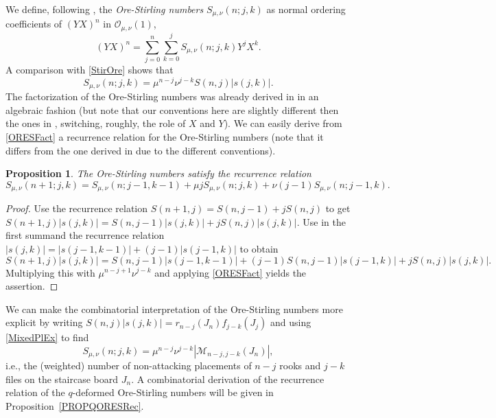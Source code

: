 \documentclass[10pt]{amsart}
\newtheorem{proposition}[theorem]{Proposition}%
\begin{document}
We define, following \cite{TMMS2023}, the {\em Ore-Stirling numbers} $S_{\mu,\nu}(n;j,k) $ as normal ordering coefficients of $(YX)^n$ in ${\mathcal O}_{\mu,\nu}(1)$,
\begin{equation}\label{OreStirlingDef}
(YX)^n = \sum_{j=0}^{n} \sum_{k=0}^{j} S_{\mu,\nu}(n;j,k) Y^{j}X^{k}.
\end{equation}
A comparison with \eqref{StirOre} shows that
\begin{equation}\label{ORESFact}
S_{\mu,\nu}(n;j,k) = \mu^{n-j} \nu^{j-k} S(n,j) |s(j,k)|.
\end{equation}
The factorization of the Ore-Stirling numbers was already derived in \cite[Theorem 3.5]{TMMS2023} in an algebraic fashion (but note that our conventions here are slightly different then the ones in \cite{TMMS2023}, switching, roughly, the role of $X$ and $Y$). We can easily derive from \eqref{ORESFact} a recurrence relation for the Ore-Stirling numbers (note that it differs from the one derived in \cite{TMMS2023} due to the different conventions).
\begin{proposition} The Ore-Stirling numbers satisfy the recurrence relation
\begin{equation}\label{ORESRec}
S_{\mu,\nu}(n+1;j,k) =S_{\mu,\nu}(n;j-1,k-1)+ \mu j S_{\mu,\nu}(n;j,k) + \nu (j-1) S_{\mu,\nu}(n;j-1,k).  
\end{equation}
\end{proposition}
\begin{proof} Use the recurrence relation $S(n+1,j)=S(n,j-1)+jS(n,j)$ to get $S(n+1,j) |s(j,k)|=S(n,j-1)|s(j,k)|+jS(n,j)|s(j,k)|$. Use in the first summand the recurrence relation $|s(j,k)|=|s(j-1,k-1)|+(j-1)|s(j-1,k)|$ to obtain
$$
S(n+1,j) |s(j,k)|=S(n,j-1)|s(j-1,k-1)|+(j-1)S(n,j-1) |s(j-1,k)|+jS(n,j)|s(j,k)|.
$$
Multiplying this with $\mu^{n-j+1} \nu^{j-k}$ and applying \eqref{ORESFact} yields the assertion. 
\end{proof}

We can make the combinatorial interpretation of the Ore-Stirling numbers more explicit by writing $S(n,j)|s(j,k)|=r_{n-j}(J_n)f_{j-k}(J_j)$ and using \eqref{MixedPlEx} to find
\begin{equation}\label{OREEX}
S_{\mu,\nu}(n;j,k) = \mu^{n-j} \nu^{j-k}|{\mathcal M}_{n-j,j-k}(J_n)|,
\end{equation}
i.e., the (weighted) number of non-attacking placements of $n-j$ rooks and $j-k$ files on the staircase board $J_n$. A combinatorial derivation of the recurrence relation of the $q$-deformed Ore-Stirling numbers will be given in Proposition~\ref{PROPQORESRec}.
\end{document}
